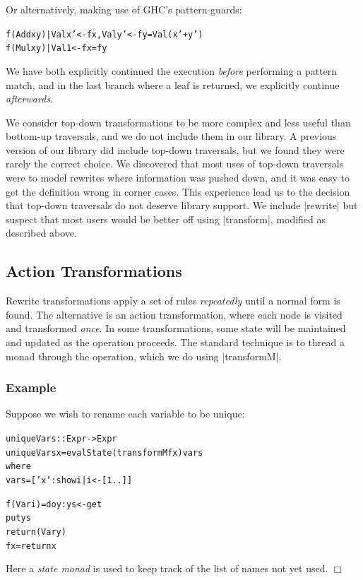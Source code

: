 \documentclass[preprint]{sigplanconf}
\newcounter{exmp}
\newcommand{\yesexample}{\subsubsection*{Example \arabic{exmp}}\refstepcounter{exmp}}
\newcommand{\noexample}{\hfill$\Box$}
\newenvironment{code}{\begin{alltt}\small}{\end{alltt}}
\newenvironment{example}{\yesexample}{\noexample}
\newcommand{\ignore}{}
\begin{document}
\noindent Or alternatively, making use of GHC's pattern-guards:

\ignore\begin{code}
f (Add  x y) | Val x'  <- f x, Val y' <- f y = Val (x'+y')
f (Mul  x y) | Val 1   <- f x = f y
\end{code}

We have both explicitly continued the execution \textit{before} performing a pattern match, and in the last branch where a leaf is returned, we explicitly continue \textit{afterwards}.

We consider top-down transformations to be more complex and less useful than bottom-up traversals, and we do not include them in our library. A previous version of our library did include top-down traversals, but we found they were rarely the correct choice. We discovered that most uses of top-down traversals were to model rewrites where information was pushed down, and it was easy to get the definition wrong in corner cases. This experience lead us to the decision that top-down traversals do not deserve library support. We include |rewrite| but suspect that most users would be better off using |transform|, modified as described above.

\subsection{Action Transformations}

Rewrite transformations apply a set of rules \textit{repeatedly} until a normal form is found. The alternative is an action transformation, where each node is visited and transformed \textit{once}. In some transformations, some state will be maintained and updated as the operation proceeds. The standard technique is to thread a monad through the operation, which we do using |transformM|.

\begin{example}
Suppose we wish to rename each variable to be unique:

\begin{code}
uniqueVars :: Expr -> Expr
uniqueVars x = evalState (transformM f x) vars
    where
        vars = ['x':show i | i <- [1..]]

        f (Var i)  = do  y:ys <- get
                         put ys
                         return (Var y)
        f x        = return x
\end{code}

Here a \textit{state monad} is used to keep track of the list of names not yet used.
\end{example}
\end{document}
